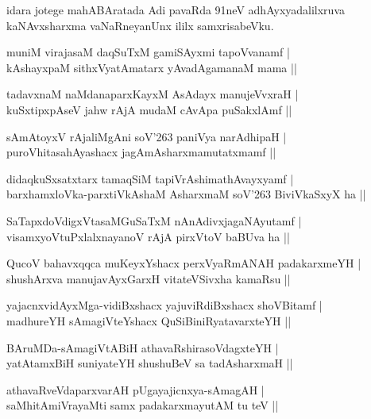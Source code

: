 \noindent
idara jotege mahABAratada Adi pavaRda 91neV adhAyxyadalilxruva kaNAvxsharxma vaNaRneyanUnx ililx samxrisabeVku.

\begin{shloka}
muniM virajasaM daqSuTxM gamiSAyxmi tapoVvanamf |\\\label{58}
kAshayxpaM sithxVyatAmatarx yAvadAgamanaM mama ||
\end{shloka}

\begin{shloka}
tadavxnaM naMdanaparxKayxM AsAdayx manujeVvxraH |\\
kuSxtipxpAseV ja{hw} rAjA mudaM cAvApa puSakxlAmf ||
\end{shloka}

\begin{shloka}
sAmAtoyxV rAjaliMgAni soV\char'263 paniVya narAdhipaH |\\
puroVhitasahAyashacx jagAmAsharxmamutatxmamf ||
\end{shloka}

\begin{shloka}
didaqkuSxsatxtarx tamaqSiM tapiVrAshimathAvayxyamf |\\
barxhamxloVka-parxtiVkAshaM AsharxmaM soV\char'263 BiviVkaSxyX ha ||
\end{shloka}

\begin{shloka}
SaTapxdoVdigxVtasaMGuSaTxM nAnAdivxjagaNAyutamf |\\
visamxyoVtuPxlalxnayanoV rAjA pirxVtoV baBUva ha ||
\end{shloka}

\begin{shloka}
QucoV bahavxqqca muKeyxYshacx perxVyaRmANAH padakarxmeYH |\\
shushArxva manujavAyxGarxH vitateVSivxha kamaRsu ||
\end{shloka}

\begin{shloka}
yajacnxvidAyxMga-vidiBxshacx yajuviRdiBxshacx shoVBitamf |\\
madhureYH sAmagiVteYshacx QuSiBiniRyatavarxteYH ||
\end{shloka}

\begin{shloka}
BAruMDa-sAmagiVtABiH athavaRshirasoVdagxteYH |\\
yatAtamxBiH suniyateYH shushuBeV sa tadAsharxmaH ||
\end{shloka}

\begin{shloka}
athavaRveVdaparxvarAH pUgayajicnxya-sAmagAH |\\
saMhitAmiVrayaMti samx padakarxmayutAM tu teV ||
\end{shloka}

